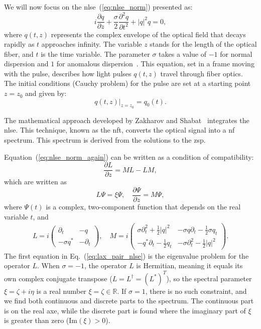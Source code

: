 We will now focus on the \gls{nlse}~(\ref{eq:nlse_norm}) presented as:
\begin{equation}
    i \frac{\partial q}{\partial z} + \frac{\sigma}{2} \frac{\partial^2 q}{\partial t^2} + |q|^2 q = 0,
    \label{eq:nlse_norm_again}
\end{equation}
where \( q(t, z) \) represents the complex envelope of the optical field that decays rapidly as \( t \) approaches infinity. The variable \( z \) stands for the length of the optical fiber, and \( t \) is the time variable. The parameter \( \sigma \) takes a value of \( -1 \) for normal dispersion and \( 1 \) for anomalous dispersion~\cite{Agrawal2010}. This equation, set in a frame moving with the pulse, describes how light pulses \( q(t, z) \) travel through fiber optics. The initial conditions (Cauchy problem) for the pulse are set at a starting point \( z=z_0 \) and given by:
\begin{equation}
    q(t, z)|_{z=z_0} = q_0(t).
\end{equation}

The mathematical approach developed by Zakharov and Shabat~\cite{zakharov1972exact} integrates the \acrshort{nlse}. This technique, known as the \acrlong{nft}, converts the optical signal into a \acrfull{nf} spectrum. This spectrum is derived from the solutions to the \acrfull{zsp}.

Equation~(\ref{eq:nlse_norm_again}) can be written as a condition of compatibility:
\begin{equation}
    \frac{\partial L}{\partial z} = ML - LM,
\end{equation}
which are written as
\begin{equation}
    L\Psi = \xi \Psi, \quad \frac{\partial \Psi}{\partial z} = M\Psi,
    \label{eq:lax_pair_nlse}
\end{equation}
where \(\Psi(t)\) is a complex, two-component function that depends on the real variable \(t\), and
\begin{align}
    L = i \begin{pmatrix} \partial_t & -q \\ -\sigma q^* & -\partial_t \end{pmatrix}, \quad
    M = i \begin{pmatrix}  \sigma \partial_t^2 + \frac{1}{2} |q|^2  & -\sigma q \partial_t - \frac{1}{2} \sigma q_t \\
    -q^* \partial_t - \frac{1}{2} q_t & - \sigma \partial_t^2 - \frac{1}{2} |q|^2  \end{pmatrix}.
    \label{eq:nlse_l_and_m}
\end{align}
The first equation in Eq.~(\ref{eq:lax_pair_nlse}) is the eigenvalue problem for the operator \(L\). When \(\sigma = -1\), the operator \(L\) is Hermitian, meaning it equals its own complex conjugate transpose (\(L = L^\dagger = (L^*)^T\)), so the spectral parameter \(\xi = \zeta + i\eta\) is a real number \(\xi = \zeta\in \mathbb{R}\). If \(\sigma = 1\), there is no such constraint, and we find both continuous and discrete parts to the spectrum. The continuous part is on the real axe, while the discrete part is found where the imaginary part of \(\xi\) is greater than zero (\(\text{Im}(\xi) > 0\)).

